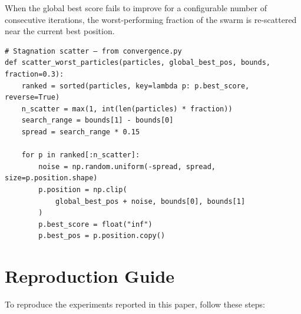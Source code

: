 When the global best score fails to improve for a configurable number
of consecutive iterations, the worst-performing fraction of the swarm
is re-scattered near the current best position.

\begin{verbatim}
# Stagnation scatter — from convergence.py
def scatter_worst_particles(particles, global_best_pos, bounds, fraction=0.3):
    ranked = sorted(particles, key=lambda p: p.best_score, reverse=True)
    n_scatter = max(1, int(len(particles) * fraction))
    search_range = bounds[1] - bounds[0]
    spread = search_range * 0.15

    for p in ranked[:n_scatter]:
        noise = np.random.uniform(-spread, spread, size=p.position.shape)
        p.position = np.clip(
            global_best_pos + noise, bounds[0], bounds[1]
        )
        p.best_score = float("inf")
        p.best_pos = p.position.copy()
\end{verbatim}


\section{Reproduction Guide}
\label{app:reproduction}

To reproduce the experiments reported in this paper, follow these steps:

